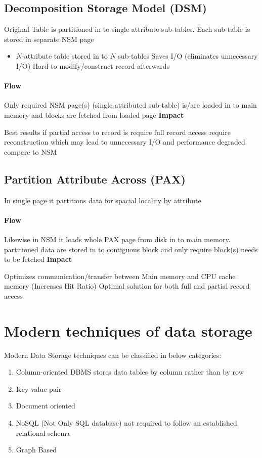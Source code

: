 \documentclass[paper=letter, fontsize=12pt]{article}
\begin{document}
\subsection{Decomposition Storage Model (DSM)}
	Original Table is partitioned in to single attribute sub-tables.
	Each sub-table is stored in separate NSM page
	\begin{itemize}
		\item $N$-attribute table stored in to $N$ sub-tables
		\tick Saves I/O (eliminates unnecessary I/O)
		\fail Hard to modify/construct record afterwards
	\end{itemize}
	
	\paragraph{Flow} 
	Only required NSM page(s) (single attributed sub-table) is/are loaded in to main memory and blocks are fetched from loaded page
	\textbf{Impact}
	\begin{itemize}
		\tick Best results if partial access to record is require
		\fail full record access require reconstruction which may lead to unnecessary I/O and performance degraded compare to NSM
	\end{itemize}

\subsection{Partition Attribute Across (PAX)}
	In single page it partitions data for spacial locality by attribute
	\paragraph{Flow} 
	Likewise in NSM it loads whole PAX page from disk in to main memory. partitioned data are stored in to contiguous block and only require block(s) needs to be fetched
	\textbf{Impact}
	\begin{itemize}
		\tick Optimizes communication/transfer between Main memory and CPU cache memory (Increases Hit Ratio)
		\tick Optimal solution for both full and partial record access
	\end{itemize}

\section{Modern techniques of data storage}
Modern Data Storage techniques can be classified in below categories:
\begin{enumerate}
	\item Column-oriented DBMS
		\subitem stores data tables by column rather than by row
	\item Key-value pair
	\item Document oriented
	\item NoSQL (Not Only SQL database)
		\subitem not required to follow an established relational schema
	\item Graph Based
\end{enumerate}
\end{document}
